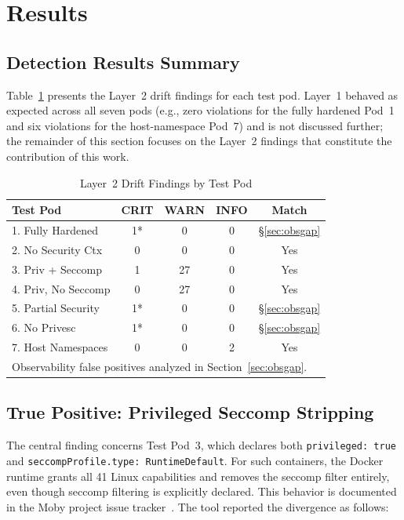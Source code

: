 \documentclass[conference]{IEEEtran}
\begin{document}
\section{Results}

\subsection{Detection Results Summary}

Table~\ref{tab:results} presents the Layer~2 drift findings for each test pod. Layer~1 behaved as expected across all seven pods (e.g., zero violations for the fully hardened Pod~1 and six violations for the host-namespace Pod~7) and is not discussed further; the remainder of this section focuses on the Layer~2 findings that constitute the contribution of this work.

\begin{table}[htbp]
\caption{Layer~2 Drift Findings by Test Pod}
\label{tab:results}
\centering
\begin{tabular}{lcccc}
\toprule
\textbf{Test Pod} & \textbf{CRIT} & \textbf{WARN} & \textbf{INFO} & \textbf{Match} \\
\midrule
1. Fully Hardened   & 1*  & 0  & 0 & \S\ref{sec:obsgap} \\
2. No Security Ctx  & 0   & 0  & 0 & Yes \\
3. Priv + Seccomp   & 1   & 27 & 0 & Yes \\
4. Priv, No Seccomp & 0   & 27 & 0 & Yes \\
5. Partial Security & 1*  & 0  & 0 & \S\ref{sec:obsgap} \\
6. No Privesc       & 1*  & 0  & 0 & \S\ref{sec:obsgap} \\
7. Host Namespaces  & 0   & 0  & 2 & Yes \\
\bottomrule
\multicolumn{5}{l}{\footnotesize *Observability false positives analyzed in Section~\ref{sec:obsgap}.}
\end{tabular}
\end{table}

\subsection{True Positive: Privileged Seccomp Stripping}

The central finding concerns Test Pod~3, which declares both \texttt{privileged: true} and \texttt{seccompProfile.type: RuntimeDefault}. For such containers, the Docker runtime grants all 41 Linux capabilities and removes the seccomp filter entirely, even though seccomp filtering is explicitly declared. This behavior is documented in the Moby project issue tracker~\cite{moby41321}. The tool reported the divergence as follows:
\end{document}

